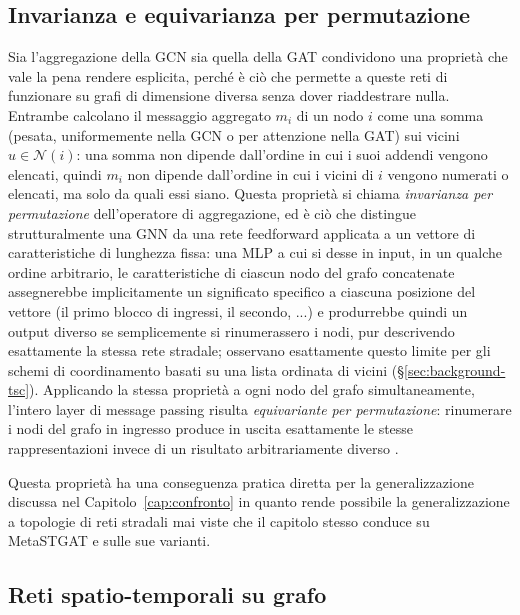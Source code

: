 \subsection{Invarianza e equivarianza per permutazione}
\label{subsec:permutation-invariance}

Sia l'aggregazione della GCN sia quella della GAT condividono una
proprietà che vale la pena rendere esplicita, perché è ciò che permette a
queste reti di funzionare su grafi di dimensione diversa senza dover
riaddestrare nulla. Entrambe calcolano il messaggio aggregato $m_i$ di un
nodo $i$ come una somma (pesata, uniformemente nella GCN o per attenzione
nella GAT) sui vicini $u \in \mathcal{N}(i)$: una somma non dipende
dall'ordine in cui i suoi addendi vengono elencati, quindi $m_i$ non
dipende dall'ordine in cui i vicini di $i$ vengono numerati o elencati, ma
solo da quali essi siano. Questa proprietà si chiama \emph{invarianza per
  permutazione} dell'operatore di aggregazione, ed è ciò che distingue
strutturalmente una GNN da una rete feedforward applicata a un vettore di
caratteristiche di lunghezza fissa: una MLP a cui si desse in input, in un
qualche ordine arbitrario, le caratteristiche di ciascun nodo del grafo
concatenate assegnerebbe implicitamente un significato specifico a ciascuna
posizione del vettore (il primo blocco di ingressi, il secondo, ...) e
produrrebbe quindi un output diverso se semplicemente si rinumerassero i
nodi, pur descrivendo esattamente la stessa rete stradale;
\citet{wei2019colight} osservano esattamente questo limite per gli schemi
di coordinamento basati su una lista ordinata di vicini
(§\ref{sec:background-tsc}). Applicando la stessa proprietà a ogni nodo del
grafo simultaneamente, l'intero layer di message passing risulta
\emph{equivariante per permutazione}: rinumerare i nodi del grafo in
ingresso produce in uscita esattamente le stesse rappresentazioni invece di un risultato arbitrariamente
diverso \citep{bronstein2021geometric}.

Questa proprietà ha una conseguenza pratica diretta per la generalizzazione
discussa nel Capitolo~\ref{cap:confronto} in quanto rende possibile la generalizzazione a topologie di reti stradali mai viste che il
capitolo stesso conduce su MetaSTGAT e sulle sue varianti.

\subsection{Reti spatio-temporali su grafo}

